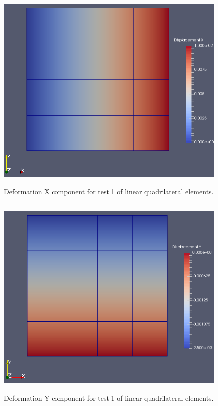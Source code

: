 \documentclass[a4paper, 12pt]{article}
\begin{document}
\begin{figure}[H]
  \centering
  \includegraphics[width=13cm, height=10cm]{quad_4_t1_disp_X}
  \caption{Deformation X component for test 1 of linear 
            quadrilateral elements.}
  \label{fig:linQuad1_x}
\end{figure}

\begin{figure}[H]
  \centering
  \includegraphics[width=13cm, height=10cm]{quad_4_t1_disp_Y}
  \caption{Deformation Y component for test 1 of linear 
            quadrilateral elements.}
  \label{fig:linQuad1_y}
\end{figure}
\end{document}
